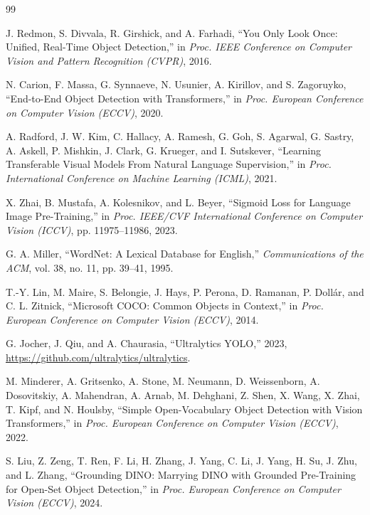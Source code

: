 \vspace{-1mm}
\begin{thebibliography}{99}

    J. Redmon, S. Divvala, R. Girshick, and A. Farhadi,
    ``You Only Look Once: Unified, Real-Time Object Detection,''
    in {\it Proc. IEEE Conference on Computer Vision and Pattern Recognition (CVPR)}, 2016.

    N. Carion, F. Massa, G. Synnaeve, N. Usunier, A. Kirillov, and S. Zagoruyko,
    ``End-to-End Object Detection with Transformers,''
    in {\it Proc. European Conference on Computer Vision (ECCV)}, 2020.

    A. Radford, J. W. Kim, C. Hallacy, A. Ramesh, G. Goh, S. Agarwal, G. Sastry, A. Askell, P. Mishkin, J. Clark, G. Krueger, and I. Sutskever,
    ``Learning Transferable Visual Models From Natural Language Supervision,''
    in {\it Proc. International Conference on Machine Learning (ICML)}, 2021.

    X. Zhai, B. Mustafa, A. Kolesnikov, and L. Beyer,
    ``Sigmoid Loss for Language Image Pre-Training,''
    in {\it Proc. IEEE/CVF International Conference on Computer Vision (ICCV)}, pp. 11975--11986, 2023.

    G. A. Miller,
    ``WordNet: A Lexical Database for English,''
    {\it Communications of the ACM}, vol. 38, no. 11, pp. 39--41, 1995.

    T.-Y. Lin, M. Maire, S. Belongie, J. Hays, P. Perona, D. Ramanan, P. Doll\'{a}r, and C. L. Zitnick,
    ``Microsoft COCO: Common Objects in Context,''
    in {\it Proc. European Conference on Computer Vision (ECCV)}, 2014.

    G. Jocher, J. Qiu, and A. Chaurasia,
    ``Ultralytics YOLO,''
    2023, \url{https://github.com/ultralytics/ultralytics}.

    M. Minderer, A. Gritsenko, A. Stone, M. Neumann, D. Weissenborn, A. Dosovitskiy, A. Mahendran, A. Arnab, M. Dehghani, Z. Shen, X. Wang, X. Zhai, T. Kipf, and N. Houlsby,
    ``Simple Open-Vocabulary Object Detection with Vision Transformers,''
    in {\it Proc. European Conference on Computer Vision (ECCV)}, 2022.

    S. Liu, Z. Zeng, T. Ren, F. Li, H. Zhang, J. Yang, C. Li, J. Yang, H. Su, J. Zhu, and L. Zhang,
    ``Grounding DINO: Marrying DINO with Grounded Pre-Training for Open-Set Object Detection,''
    in {\it Proc. European Conference on Computer Vision (ECCV)}, 2024.


\end{thebibliography}
